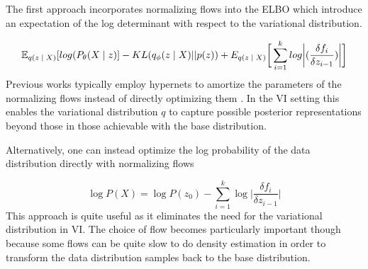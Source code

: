 


The first approach incorporates normalizing flows into the \ac{ELBO} which introduce an expectation of the log determinant with respect to the variational distribution.

\begin{equation}
\operatorname{\mathbb{E}}_{q(z \; | \;{X})} [ log(P_{\theta}(X \; | \;{z}) ]  - KL(q_{\phi}(z \; | \;{X}) || p(z)) + E_{q(z\; | \;{X})}\bigg[\sum_{i=1}^{k}log \bigg|(\frac{\delta f_{i}}{\delta z_{i-1}})\bigg|\bigg]
\end{equation}
Previous works typically employ hypernets \cite{ha2016hypernets} to amortize the parameters of the normalizing flows instead of directly optimizing them  \cite{rezende2015VIwithNF,tomczak2016Householder,vdberg2018sylvester}. In the \ac{VI} setting this enables the variational distribution $q$ to capture possible posterior representations beyond those in those achievable with the base distribution.

Alternatively, one can instead optimize the log probability of the data distribution directly with normalizing flows
 
\begin{equation}
	\log P(X) = \log P(z_{0}) - \sum_{i=1}^{k} \log \bigg| \frac{\delta f_{i}}{\delta z_{i-1}} \bigg|
\end{equation}
This approach is quite useful as it eliminates the need for the variational distribution in \ac{VI}. The choice of flow becomes particularly important though because some flows can be quite slow to do density estimation in order to transform the data distribution samples back to the base distribution. 

